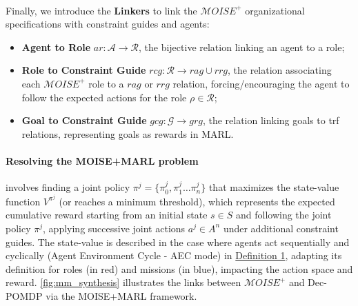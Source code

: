 \documentclass[pdflatex,sn-mathphys-num]{sn-jnl}%
\theoremstyle{thmstyleone}%
\theoremstyle{thmstyletwo}%
\theoremstyle{thmstylethree}%
\begin{document}
\

\noindent Finally, we introduce the \textbf{Linkers} to link the $\mathcal{M}OISE^+$ organizational specifications with constraint guides and agents:
%
\begin{itemize}
    \item \textbf{Agent to Role} \quad $ar: \mathcal{A} \to \mathcal{R}$, the bijective relation linking an agent to a role;
    \item \textbf{Role to Constraint Guide} \quad $rcg: \mathcal{R} \rightarrow rag \cup rrg$, the relation associating each $\mathcal{M}OISE^+$ role to a $rag$ or $rrg$ relation, forcing/encouraging the agent to follow the expected actions for the role $\rho \in \mathcal{R}$;
    \item \textbf{Goal to Constraint Guide} \quad $gcg: \mathcal{G} \rightarrow grg$, the relation linking goals to trf relations, representing goals as rewards in MARL.
\end{itemize}

\paragraph{\textbf{Resolving the MOISE+MARL problem}}
involves finding a joint policy $\pi^{j} = \{\pi^j_0,\pi^j_1\dots\pi^j_n\}$ that maximizes the state-value function $V^{\pi^{j}}$ (or reaches a minimum threshold), which represents the expected cumulative reward starting from an initial state $s \in S$ and following the joint policy $\pi^{j}$, applying successive joint actions $a^{j} \in A^n$ under additional constraint guides. The state-value is described in the case where agents act sequentially and cyclically (Agent Environment Cycle - AEC mode) in \hyperref[eq:single_value_function]{Definition 1}, adapting its definition for roles (in red) and missions (in blue), impacting the action space and reward. \autoref{fig:mm_synthesis} illustrates the links between $\mathcal{M}OISE^+$ and Dec-POMDP via the MOISE+MARL framework.
\end{document}
